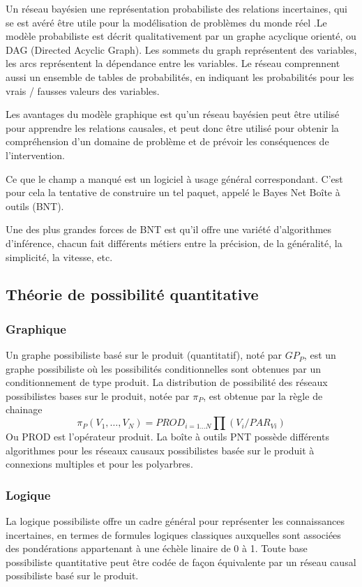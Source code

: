 Un réseau bayésien une représentation probabiliste des relations incertaines, qui se est avéré être utile pour la modélisation de problèmes du monde réel .Le modèle probabiliste est décrit qualitativement par un graphe acyclique orienté, ou DAG (Directed Acyclic Graph). Les sommets du graph représentent des variables, les arcs représentent la dépendance entre les variables. Le réseau comprennent aussi un ensemble de tables de probabilités, en indiquant les probabilités pour les vrais / fausses valeurs des variables.

Les avantages du  modèle graphique est qu’un réseau bayésien peut être utilisé pour apprendre les relations causales, et peut donc être utilisé pour obtenir la compréhension d'un domaine de problème et de prévoir les conséquences de l'intervention.

Ce que le champ a manqué est un logiciel à usage général correspondant. C’est pour cela la tentative de construire un tel paquet, appelé le Bayes Net Boîte à outils (BNT).

Une des plus grandes forces de BNT est qu'il offre une variété d'algorithmes d'inférence, chacun fait différents métiers entre la précision, de la généralité, la simplicité, la vitesse, etc.


\subsection{Théorie de possibilité quantitative}

\subsubsection{Graphique}

Un graphe possibiliste basé sur le produit (quantitatif), noté par $GP_{P}$, est un graphe possibiliste où les possibilités conditionnelles sont obtenues par un conditionnement de type produit. La distribution de possibilité des réseaux possibilistes bases sur le produit, notée par $\pi_{P}$, est obtenue par la règle de chainage 
\begin{equation}
\pi_{P} (V_1, \dots , V_N) = PROD_{i=1 \dots N} \prod  (V_i/PAR_{Vi})
\end{equation}
Ou PROD est l’opérateur produit.\cite{BoBrDu2008.1}
La boîte à outils PNT possède différents algorithmes pour les réseaux causaux possibilistes basée sur le produit à connexions multiples et pour les polyarbres. 
\subsubsection{Logique}
La logique possibiliste offre un cadre général pour représenter les connaissances incertaines, en termes de formules logiques classiques auxquelles sont associées des pondérations appartenant à une échèle linaire de 0 à 1. Toute base possibiliste quantitative peut être codée de façon équivalente par un réseau causal possibiliste basé sur le produit.

